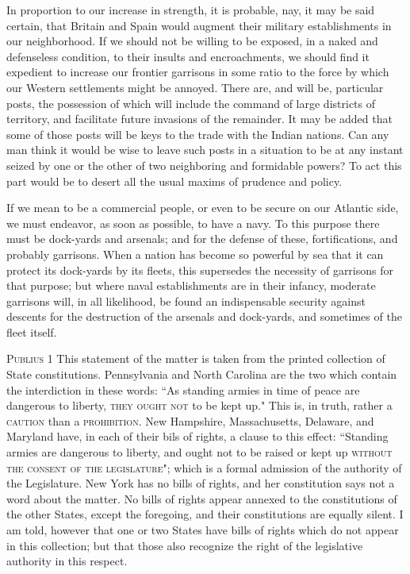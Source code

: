 In proportion to our increase in strength, it is probable, nay, it may be said certain, that Britain and Spain would augment their military establishments in our neighborhood. If we should not be willing to be exposed, in a naked and defenseless condition, to their insults and encroachments, we should find it expedient to increase our frontier garrisons in some ratio to the force by which our Western settlements might be annoyed. There are, and will be, particular posts, the possession of which will include the command of large districts of territory, and facilitate future invasions of the remainder. It may be added that some of those posts will be keys to the trade with the Indian nations. Can any man think it would be wise to leave such posts in a situation to be at any instant seized by one or the other of two neighboring and formidable powers? To act this part would be to desert all the usual maxims of prudence and policy.

If we mean to be a commercial people, or even to be secure on our Atlantic side, we must endeavor, as soon as possible, to have a navy. To this purpose there must be dock-yards and arsenals; and for the defense of these, fortifications, and probably garrisons. When a nation has become so powerful by sea that it can protect its dock-yards by its fleets, this supersedes the necessity of garrisons for that purpose; but where naval establishments are in their infancy, moderate garrisons will, in all likelihood, be found an indispensable security against descents for the destruction of the arsenals and dock-yards, and sometimes of the fleet itself.

\vspace{.5cm}
\textsc{Publius}
1 This statement of the matter is taken from the printed collection of State constitutions. Pennsylvania and North Carolina are the two which contain the interdiction in these words: ``As standing armies in time of peace are dangerous to liberty, \textsc{they ought not }to be kept up." This is, in truth, rather a \textsc{caution }than a \textsc{prohibition}. New Hampshire, Massachusetts, Delaware, and Maryland have, in each of their bils of rights, a clause to this effect: ``Standing armies are dangerous to liberty, and ought not to be raised or kept up \textsc{without the consent of the legislature}"; which is a formal admission of the authority of the Legislature. New York has no bills of rights, and her constitution says not a word about the matter. No bills of rights appear annexed to the constitutions of the other States, except the foregoing, and their constitutions are equally silent. I am told, however that one or two States have bills of rights which do not appear in this collection; but that those also recognize the right of the legislative authority in this respect.

